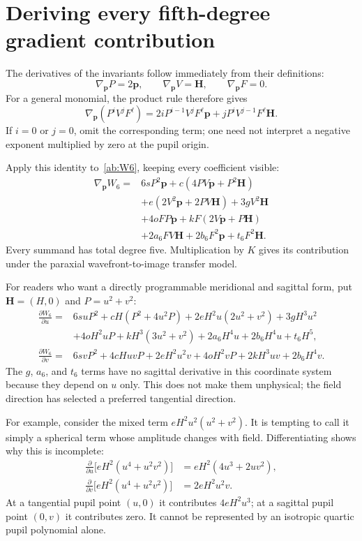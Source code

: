 \section{Deriving every fifth-degree gradient contribution}
The derivatives of the invariants follow immediately from their definitions:
\begin{equation}
 \nabla_{\bm p}P=2\bm p,\qquad
 \nabla_{\bm p}V=\bm H,\qquad
 \nabla_{\bm p}F=0.
\end{equation}
For a general monomial, the product rule therefore gives
\begin{equation}
 \nabla_{\bm p}(P^iV^jF^\ell)
 =2iP^{i-1}V^jF^\ell\bm p
  +jP^iV^{j-1}F^\ell\bm H.
 \label{ab:monomialgradient}
\end{equation}
If $i=0$ or $j=0$, omit the corresponding term; one need not interpret a
negative exponent multiplied by zero at the pupil origin.

Apply this identity to~\eqref{ab:W6}, keeping every coefficient visible:
\begin{align}
 \nabla_{\bm p}W_6={}&6sP^2\bm p
   +c(4PV\bm p+P^2\bm H)\nonumber\\
 &+e(2V^2\bm p+2PV\bm H)+3gV^2\bm H\nonumber\\
 &+4oFP\bm p+kF(2V\bm p+P\bm H)\nonumber\\
 &+2a_6FV\bm H+2b_6F^2\bm p+t_6F^2\bm H.
 \label{ab:W6gradient}
\end{align}
Every summand has total degree five. Multiplication by $K$ gives its
contribution under the paraxial wavefront-to-image transfer model.

For readers who want a directly programmable meridional and sagittal form,
put $\bm H=(H,0)$ and $P=u^2+v^2$:
\begin{align}
 \frac{\partial W_6}{\partial u}={}&
 6suP^2+cH(P^2+4u^2P)+2eH^2u(2u^2+v^2)
       +3gH^3u^2\nonumber\\
 &+4oH^2uP+kH^3(3u^2+v^2)
       +2a_6H^4u+2b_6H^4u+t_6H^5,\\
 \frac{\partial W_6}{\partial v}={}&
 6svP^2+4cHuvP+2eH^2u^2v
       +4oH^2vP+2kH^3uv+2b_6H^4v.
 \label{ab:W6cartgradient}
\end{align}
The $g$, $a_6$, and $t_6$ terms have no sagittal derivative in this coordinate
system because they depend on $u$ only. This does not make them unphysical;
the field direction has selected a preferred tangential direction.

For example, consider the mixed term
$eH^2u^2(u^2+v^2)$. It is tempting to call it simply a spherical term whose
amplitude changes with field. Differentiating shows why this is incomplete:
\begin{align}
 \frac{\partial}{\partial u}
   \bigl[eH^2(u^4+u^2v^2)\bigr]
 &=eH^2(4u^3+2uv^2),\\
 \frac{\partial}{\partial v}
   \bigl[eH^2(u^4+u^2v^2)\bigr]
 &=2eH^2u^2v.
\end{align}
At a tangential pupil point $(u,0)$ it contributes $4eH^2u^3$; at a sagittal
pupil point $(0,v)$ it contributes zero. It cannot be represented by an
isotropic quartic pupil polynomial alone.

